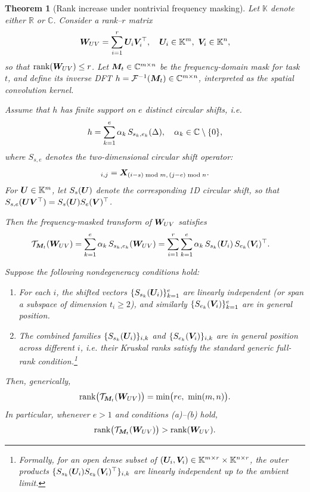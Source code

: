 \documentclass{article}
\theoremstyle{plain}
\newtheorem{theorem}{Theorem}[section]
\theoremstyle{definition}
\theoremstyle{remark}
\begin{document}
\begin{theorem}[Rank increase under nontrivial frequency masking]
\label{thm:rank_increasement}
Let $\mathbb{K}$ denote either $\mathbb{R}$ or $\mathbb{C}$.
Consider a rank--$r$ matrix
\[
{\bm{W}}_{UV} = \sum_{i=1}^r {\bm{U}}_i {\bm{V}}_i^\top, \quad 
  {\bm{U}}_i \in \mathbb{K}^m,\ {\bm{V}}_i \in \mathbb{K}^n,
\]
so that $\operatorname{rank}({\bm{W}}_{UV}) \le r$.
Let ${\bm{M}}_t \in \mathbb{C}^{m\times n}$ be the frequency-domain mask for task $t$, and define its inverse DFT
$h = \mathcal{F}^{-1}({\bm{M}}_t) \in \mathbb{C}^{m\times n}$, 
interpreted as the spatial convolution kernel.

Assume that $h$ has finite support on $e$ distinct circular shifts, i.e.
\begin{align}
h = \sum_{k=1}^{e} \alpha_k\, S_{s_k,e_k}(\Delta),
\quad \alpha_k \in \mathbb{C}\setminus\{0\}, \notag
\end{align}
where $S_{s,e}$ denotes the two-dimensional circular shift operator:
\begin{align}
  [S_{s,e}(\mX)]_{i,j} = \mX_{(i-s)\bmod m,\,(j-e)\bmod n}. \notag
\end{align}
For ${\bm{U}}\in\mathbb{K}^m$, let $S_s({\bm{U}})$ denote the corresponding 1D circular shift, 
so that $S_{s,e}({\bm{U}} {\bm{V}}^\top) = S_s({\bm{U}}) S_e({\bm{V}})^\top$.

Then the frequency-masked transform of ${\bm{W}}_{UV}$ satisfies
\begin{align}
\mathcal{T}_{{\bm{M}}_t}({\bm{W}}_{UV})
  &= \sum_{k=1}^{e} \alpha_k\, S_{s_k,e_k}({\bm{W}}_{UV})
   = \sum_{i=1}^{r}\sum_{k=1}^{e} \alpha_k\, S_{s_k}({\bm{U}}_i)\,S_{e_k}({\bm{V}}_i)^\top. \notag
\end{align}

Suppose the following \emph{nondegeneracy conditions} hold:
\begin{enumerate}
\item[\textbf{(a)}] For each $i$, the shifted vectors $\{S_{s_k}({\bm{U}}_i)\}_{k=1}^e$ are linearly independent (or span a subspace of dimension $t_i \ge 2$), and similarly $\{S_{e_k}({\bm{V}}_i)\}_{k=1}^e$ are in general position.
\item[\textbf{(b)}] The combined families $\{S_{s_k}({\bm{U}}_i)\}_{i,k}$ and $\{S_{e_k}({\bm{V}}_i)\}_{i,k}$ are in general position across different $i$, i.e. their Kruskal ranks satisfy the standard generic full-rank condition.\footnote{Formally, for an open dense subset of $({\bm{U}}_i,{\bm{V}}_i)\in\mathbb{K}^{m\times r}\times\mathbb{K}^{n\times r}$, the outer products $\{S_{s_k}({\bm{U}}_i)S_{e_k}({\bm{V}}_i)^\top\}_{i,k}$ are linearly independent up to the ambient limit.}
\end{enumerate}
Then, generically,
\begin{align}
\operatorname{rank}\!\big(\mathcal{T}_{{\bm{M}}_t}({\bm{W}}_{UV})\big)
  = \min\!\big(re,\ \min(m,n)\big). \notag
\end{align}
In particular, whenever $e>1$ and conditions (a)--(b) hold,
\begin{align}
\operatorname{rank}\!\big(\mathcal{T}_{{\bm{M}}_t}({\bm{W}}_{UV})\big)
   > \operatorname{rank}({\bm{W}}_{UV}). \notag
\end{align}
\end{theorem}
\end{document}
